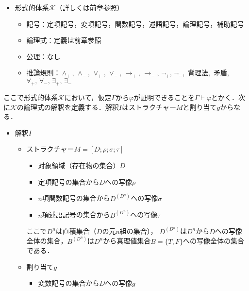 \documentclass[10pt,b5paper,papersize,dvipdfmx]{jsbook}
\begin{document}
    \begin{itemize}
      \item 形式的体系$\mathcal K$（詳しくは前章参照）
        \begin{itemize}
          \item 記号：定項記号，変項記号，関数記号，述語記号，論理記号，補助記号
          \item 論理式：定義は前章参照
          \item 公理：なし
          \item 推論規則：$\land_+,\, \land_-,\, \lor_+,\, \lor_-,\, \to_+,\, \to_-,\, \lnot_+,\, \lnot_-$,\, 背理法,\, 矛盾,\, $\forall_+,\, \forall_-,\, \exists_+,\, \exists_-$
        \end{itemize}
    \end{itemize}
    ここで形式的体系$\mathcal K$において，仮定$\Gamma$から$\varphi$が証明できることを$\Gamma \vdash \varphi$とかく．次に$\mathcal K$の論理式の解釈を定義する．解釈$I$はストラクチャー$M$と割り当て$g$からなる．
    \begin{itemize}
      \item 解釈$I$
    \begin{itemize}
    \item ストラクチャー$M=[D;\rho;\sigma;\tau]$
      \begin{itemize}
        \item 対象領域（存在物の集合）$D$
        \item 定項記号の集合から$D$への写像$\rho$
        \item $n$項関数記号の集合から$D^{(D^n)}$への写像$\sigma$
        \item $n$項述語記号の集合から$B^{(D^n)}$への写像$\tau$
      \end{itemize}
      ここで$D^n$は直積集合（$D$の元$n$組の集合）， $D^{(D^n)}$は$D^n$から$D$への写像全体の集合，$B^{(D^n)}$は$D^n$から真理値集合$B=\{T,F\}$への写像全体の集合である．
    \item 割り当て$g$
      \begin{itemize}
        \item 変数記号の集合から$D$への写像$g$
      \end{itemize}
  \end{itemize}
\end{itemize}
\end{document}
